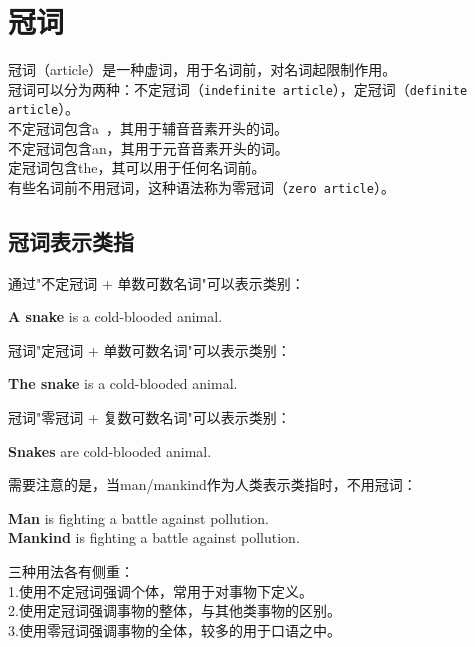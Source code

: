 \documentclass[UTF8]{ctexart}
\newcommand{\littf}[1]{{\hspace{3pt}\ttfamily #1}}
\begin{document}
\newpage

\section{冠词}
    冠词（\littf{article}）是一种虚词，用于名词前，对名词起限制作用。\\[3mm]
    冠词可以分为两种：不定冠词（\texttt{indefinite article}），定冠词（\texttt{definite article}）。\\[3mm]
    不定冠词包含\littf{a~}，其用于辅音音素开头的词。\\[3mm]
    不定冠词包含\littf{an}，其用于元音音素开头的词。\\[3mm]
    定冠词包含\littf{the}，其可以用于任何名词前。\\[3mm]
    有些名词前不用冠词，这种语法称为零冠词（\texttt{zero article}）。

\subsection{冠词表示类指}
    通过\littf{"不定冠词 + 单数可数名词"}可以表示类别：
    \begin{center}
        \large\ttfamily
        \textbf{A snake} is a cold-blooded animal.\\[6mm]
    \end{center}
    冠词\littf{"定冠词 + 单数可数名词"}可以表示类别：
    \begin{center}
        \large\ttfamily
        \textbf{The snake} is a cold-blooded animal.\\[6mm]
    \end{center}
    冠词\littf{"零冠词 + 复数可数名词"}可以表示类别：
    \begin{center}
        \large\ttfamily
        \textbf{Snakes} are cold-blooded animal.\\[6mm]
    \end{center}
    需要注意的是，当\littf{man/mankind}作为人类表示类指时，不用冠词：
    \begin{center}
        \large\ttfamily
        \textbf{Man} is fighting a battle against pollution.\\[3mm]
        \textbf{Mankind} is fighting a battle against pollution.\\[6mm]
    \end{center}
    三种用法各有侧重：\\[3mm]
    1.使用不定冠词强调个体，常用于对事物下定义。\\[3mm]
    2.使用定冠词强调事物的整体，与其他类事物的区别。\\[3mm]
    3.使用零冠词强调事物的全体，较多的用于口语之中。\\[3mm]
\end{document}
